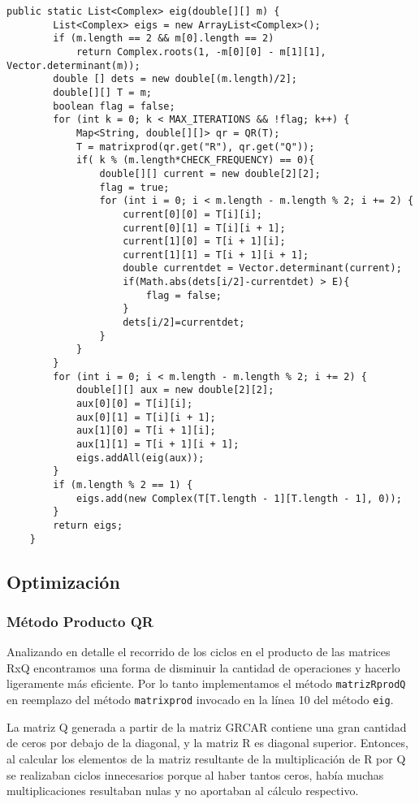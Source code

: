 \documentclass[a4paper,10pt]{article}
\begin{document}
\begin{lstlisting}[caption = Implementación del algoritmo QR en Java]
public static List<Complex> eig(double[][] m) {
		List<Complex> eigs = new ArrayList<Complex>();
		if (m.length == 2 && m[0].length == 2)
			return Complex.roots(1, -m[0][0] - m[1][1], Vector.determinant(m));
		double [] dets = new double[(m.length)/2];
		double[][] T = m;
		boolean flag = false;
		for (int k = 0; k < MAX_ITERATIONS && !flag; k++) {
			Map<String, double[][]> qr = QR(T);
			T = matrixprod(qr.get("R"), qr.get("Q"));
			if( k % (m.length*CHECK_FREQUENCY) == 0){
				double[][] current = new double[2][2];
				flag = true;
				for (int i = 0; i < m.length - m.length % 2; i += 2) {
					current[0][0] = T[i][i];
					current[0][1] = T[i][i + 1];
					current[1][0] = T[i + 1][i];
					current[1][1] = T[i + 1][i + 1];
					double currentdet = Vector.determinant(current);
					if(Math.abs(dets[i/2]-currentdet) > E){
						flag = false;
					}
					dets[i/2]=currentdet;
				}
			}
		}
		for (int i = 0; i < m.length - m.length % 2; i += 2) {
			double[][] aux = new double[2][2];
			aux[0][0] = T[i][i];
			aux[0][1] = T[i][i + 1];
			aux[1][0] = T[i + 1][i];
			aux[1][1] = T[i + 1][i + 1];
			eigs.addAll(eig(aux));
		}
		if (m.length % 2 == 1) {
			eigs.add(new Complex(T[T.length - 1][T.length - 1], 0));
		}
		return eigs;
	}
\end{lstlisting}

\subsection{Optimización}

\subsubsection{Método Producto QR}

Analizando en detalle el recorrido de los ciclos en el producto de las matrices RxQ encontramos una forma de disminuir la cantidad de operaciones y hacerlo ligeramente más eficiente. Por lo tanto implementamos el método  \texttt{matrizRprodQ} en reemplazo del método  \texttt{matrixprod} invocado en la línea 10 del método \texttt{eig}.

La matriz Q generada a partir de la matriz GRCAR contiene una gran cantidad de ceros por debajo de la diagonal, y la  matriz R es diagonal superior. Entonces, al calcular los elementos de la matriz resultante de la multiplicación de R por Q se realizaban ciclos innecesarios porque al haber tantos ceros, había muchas multiplicaciones resultaban nulas y no aportaban al cálculo respectivo.
\end{document}
